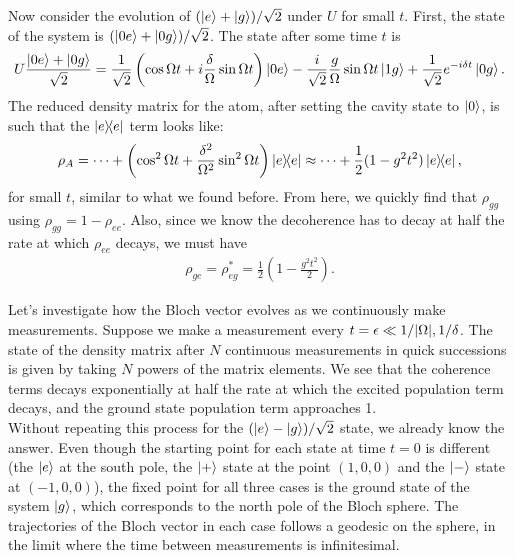 \documentclass{article}
\theoremstyle{definition}
\newcommand{\f}[2]{\frac{#1}{#2}}
\newcommand{\lp}{\left(}
\newcommand{\rp}{\right)}
\begin{document}
\begin{enumerate}[label=(\alph*)]
Now consider the evolution of $( \ket{e} + \ket{g} )/\sqrt{2}$ under $U$ for small $t$. First, the state of the system is $( \ket{0e} + \ket{0g} )/\sqrt{2}$. The state after some time $t$ is 
\begin{align*}
U\f{\ket{0e} + \ket{0g}}{\sqrt{2}} = \f{1}{\sqrt{2}}\lp \cos \Omega t + i \f{\delta}{\Omega} \sin\Omega t \rp \ket{0e} - \f{i}{\sqrt{2}} \f{g}{\Omega} \sin\Omega t \ket{1g} + \f{1}{\sqrt{2}} e^{-i \delta t } \ket{0g}.
\end{align*}
The reduced density matrix for the atom, after setting the cavity state to $\ket{0}$, is such that the $\ketbra{e}$ term looks like:
\begin{align*}
\rho_A =  \dots + \lp \cos^2 \Omega t + \f{\delta^2}{\Omega^2}\sin^2 \Omega t \rp 
\ketbra{e} \approx \dots + \f{1}{2} (1 - g^2 t^2 ) \ketbra{e},
\end{align*}
for small $t$, similar to what we found before. From here, we quickly find that $\rho_{gg}$ using $\rho_{gg} = 1 - \rho_{ee}$. Also, since we know the decoherence has to decay at half the rate at which $\rho_{ee}$ decays, we must have
\begin{align*}
\rho_{ge} = \rho_{eg}^* = \f{1}{{2}} \lp 1 - \f{g^2 t^2}{2}\rp.  
\end{align*}


Let's investigate how the Bloch vector evolves as we continuously make measurements. Suppose we make a measurement every $t = \epsilon \ll 1/\abs{\Omega}, 1/\delta$. The state of the density matrix after $N$ continuous measurements in quick successions is given by taking $N$ powers of the matrix elements. We see that the coherence terms decays exponentially at half the rate at which the excited population term decays, and the ground state population term approaches 1. \\

Without repeating this process for the $(\ket{e}  - \ket{g})/\sqrt{2}$ state, we already know the answer. Even though the starting point for each state at time $t=0$ is different (the $\ket{e}$ at the south pole, the $\ket{+}$ state at the point $(1,0,0)$ and the $\ket{-}$ state at $(-1,0,0)$), the fixed point for all three cases is the ground state of the system $\ket{g}$, which corresponds to the north pole of the Bloch sphere. The trajectories of the Bloch vector in each case follows a geodesic on the sphere, in the limit where the time between measurements is infinitesimal. 


\end{enumerate}
\end{document}
